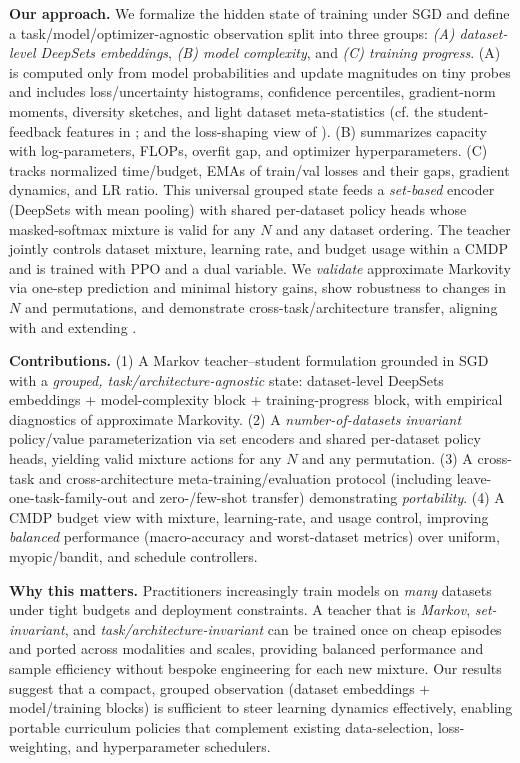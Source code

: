 \documentclass[11pt]{article}
\newcommand{\1}{\mathbf{1}}
\begin{document}
\textbf{Our approach.} We formalize the hidden state of training under SGD and define a task/model/optimizer-agnostic observation split into three groups: \emph{(A) dataset-level DeepSets embeddings}, \emph{(B) model complexity}, and \emph{(C) training progress}. (A) is computed only from model probabilities and update magnitudes on tiny probes and includes loss/uncertainty histograms, confidence percentiles, gradient-norm moments, diversity sketches, and light dataset meta-statistics (cf. the student-feedback features in \citet{fan2018l2t}; and the loss-shaping view of \citet{wu2018l2tloss}). (B) summarizes capacity with log-parameters, FLOPs, overfit gap, and optimizer hyperparameters. (C) tracks normalized time/budget, EMAs of train/val losses and their gaps, gradient dynamics, and LR ratio. This universal grouped state feeds a \emph{set-based} encoder (DeepSets with mean pooling) with shared per-dataset policy heads whose masked-softmax mixture is valid for any $N$ and any dataset ordering. The teacher jointly controls dataset mixture, learning rate, and budget usage within a CMDP and is trained with PPO and a dual variable. We \emph{validate} approximate Markovity via one-step prediction and minimal history gains, show robustness to changes in $N$ and permutations, and demonstrate cross-task/architecture transfer, aligning with and extending \citet{fan2018l2t,wu2018l2tloss}.

\textbf{Contributions.} (1) A Markov teacher--student formulation grounded in SGD with a \emph{grouped, task/architecture-agnostic} state: dataset-level DeepSets embeddings + model-complexity block + training-progress block, with empirical diagnostics of approximate Markovity. (2) A \emph{number-of-datasets invariant} policy/value parameterization via set encoders and shared per-dataset policy heads, yielding valid mixture actions for any $N$ and any permutation. (3) A cross-task and cross-architecture meta-training/evaluation protocol (including leave-one-task-family-out and zero-/few-shot transfer) demonstrating \emph{portability}. (4) A CMDP budget view with mixture, learning-rate, and usage control, improving \emph{balanced} performance (macro-accuracy and worst-dataset metrics) over uniform, myopic/bandit, and schedule controllers.

\textbf{Why this matters.} Practitioners increasingly train models on \emph{many} datasets under tight budgets and deployment constraints. A teacher that is \emph{Markov}, \emph{set-invariant}, and \emph{task/architecture-invariant} can be trained once on cheap episodes and ported across modalities and scales, providing balanced performance and sample efficiency without bespoke engineering for each new mixture. Our results suggest that a compact, grouped observation (dataset embeddings + model/training blocks) is sufficient to steer learning dynamics effectively, enabling portable curriculum policies that complement existing data-selection, loss-weighting, and hyperparameter schedulers.
\end{document}
